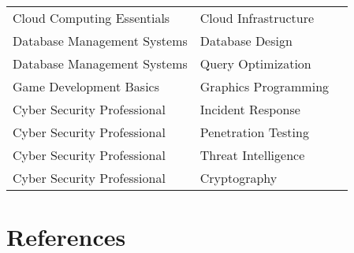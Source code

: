 \documentclass{article}
\begin{document}
\begin{tabular}{lll}
   Cloud Computing Essentials & Cloud Infrastructure &  \cite{leeCloudComputingEssentials2023}\\
  Database Management Systems & Database Design  & \cite{adamsDatabaseManagementSystems2023} \\
  Database Management Systems & Query Optimization & \cite{adamsDatabaseManagementSystems2023} \\
  Game Development Basics & Graphics Programming & \cite{martinezGameDevelopmentBasics2023}  \\


  Cyber Security Professional  &  Incident Response & \cite{thompsonCyberSecurityPro2024,williamsCyberSecurityPro2023} \\
 Cyber Security Professional  & Penetration Testing & \cite{thompsonCyberSecurityPro2024,williamsCyberSecurityPro2023} \\
  Cyber Security Professional  & Threat Intelligence & \cite{thompsonCyberSecurityPro2024,williamsCyberSecurityPro2023} \\
 
  Cyber Security Professional  &  Cryptography & \cite{thompsonCyberSecurityPro2024,williamsCyberSecurityPro2023} \\
  \hline 
  \end{tabular}

  


\section{References}

% 
% 
\printbibliography 
\end{document}
